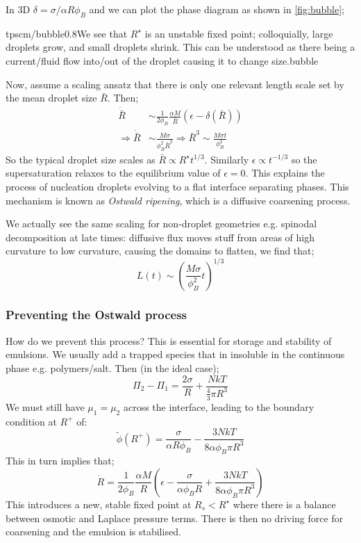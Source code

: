 In 3D $\delta = \sigma/\alpha R\phi_B$ and we can plot the phase diagram as shown in \autoref{fig:bubble};
\begin{mygraphic}{tpscm/bubble}{0.8}{We see that $R^{\star}$ is an unstable fixed point; colloquially, large droplets grow, and small droplets shrink. This can be understood as there being a current/fluid flow into/out of the droplet causing it to change size.}{bubble}\end{mygraphic}
Now, assume a scaling ansatz that there is only one relevant length scale set by the mean droplet size $\bar{R}$. Then;
\begin{align*}
\dot{\bar{R}} &\sim \frac{1}{2\phi_B}\frac{\alpha M}{\bar{R}}\left(\epsilon - \delta(\bar{R})\right) \\
\Rightarrow \dot{\bar{R}} &\sim \frac{M\sigma}{\phi_B^2 \bar{R}^2} \Rightarrow \bar{R}^{3} \sim \frac{M\sigma t}{\phi_B^2}
\end{align*}
So the typical droplet size scales as $\bar{R} \propto R^{\star}t^{1/3}$. Similarly $\epsilon \propto t^{-1/3}$ so the supersaturation relaxes to the equilibrium value of $\epsilon = 0$. This explains the process of nucleation droplets evolving to a flat interface separating phases. This mechanism is known as \emph{Ostwald ripening}, which is a diffusive coarsening process. 

\paraskip
We actually see the same scaling for non-droplet geometries e.g. spinodal decomposition at late times: diffusive flux moves stuff from areas of high curvature to low curvature, causing the domains to flatten, we find that;
\begin{equation*}
L(t) \sim \left(\frac{M\sigma}{\phi_B^2}t\right)^{1/3}
\end{equation*}
\subsubsection*{Preventing the Ostwald process}
How do we prevent this process? This is essential for storage and stability of emulsions. We usually add a trapped species that in insoluble in the continuous phase e.g. polymers/salt. Then (in the ideal case);
\begin{equation*}
\Pi_2 - \Pi_1 = \frac{2\sigma}{R} + \frac{NkT}{\tfrac{4}{3}\pi R^3}
\end{equation*}
We must still have $\mu_1 = \mu_2$ across the interface, leading to the boundary condition at $R^{+}$ of:
\begin{equation*}
\tilde{\phi}(R^{+}) = \frac{\sigma}{\alpha R\phi_B} - \frac{3NkT}{8\alpha\phi_B \pi R^3}
\end{equation*}
This in turn implies that;
\begin{equation}
\dot{R} = \frac{1}{2\phi_B}\frac{\alpha M}{R}\left(\epsilon - \frac{\sigma}{\alpha \phi_B R} + \frac{3NkT}{8\alpha \phi_B \pi R^3}\right)
\end{equation}
This introduces a new, stable fixed point at $R_s < R^{\star}$ where there is a balance between osmotic and Laplace pressure terms. There is then no driving force for coarsening and the emulsion is stabilised.
